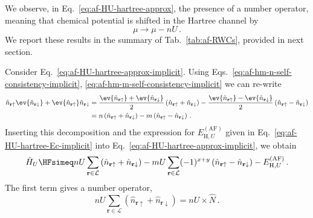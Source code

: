 We observe, in Eq.~\eqref{eq:af-HU-hartree-approx}, the presence of a number operator, meaning that chemical potential is shifted in the Hartree channel by
\begin{equation}\label{eq:af-mu-hU}
	\mu \to \mu - nU \, .
\end{equation}
We report these results in the summary of Tab.~\ref{tab:af-RWCs}, provided in next section.

\begin{tabproof}
	
	Consider Eq.~\eqref{eq:af-HU-hartree-approx-implicit}. Using Eqs.~\eqref{eq:af-hm-n-self-consistency-implicit}, \eqref{eq:af-hm-m-self-consistency-implicit} we can re-write
	\[
	\begin{aligned}
		\hat n_{\mathbf{r}\uparrow} \ev{\hat n_{\mathbf{r}\downarrow}} + \ev{\hat n_{\mathbf{r}\uparrow}} \hat n_{\mathbf{r}\downarrow}
		&= \frac{\ev{\hat n_{\mathbf{r}\uparrow}} + \ev{\hat n_{\mathbf{r}\downarrow}}}{2} \left(
		\hat n_{\mathbf{r}\uparrow} + \hat n_{\mathbf{r}\downarrow}
		\right) - \frac{\ev{\hat n_{\mathbf{r}\uparrow}} - \ev{\hat n_{\mathbf{r}\downarrow}}}{2} \left(
		\hat n_{\mathbf{r}\uparrow} - \hat n_{\mathbf{r}\downarrow}
		\right) \\
		&= n \left(
		\hat n_{\mathbf{r}\uparrow} + \hat n_{\mathbf{r}\downarrow}
		\right) - m \left(
		\hat n_{\mathbf{r}\uparrow} - \hat n_{\mathbf{r}\downarrow}
		\right) \, .
	\end{aligned}
	\]
	Inserting this decomposition and the expression for $E_{\mathrm{H},U}^{(\mathrm{AF})}$ given in Eq.~\eqref{eq:af-HU-hartree-Ec-implicit} into Eq.~\eqref{eq:af-HU-hartree-approx-implicit}, we obtain
	\begin{equation} \label{eq:af-HU-hartree-Ec-implicit-int1}
		\hat H_U \HFsimeq nU \sum_{\mathbf{r}\in\mathcal{L}} \left(
		\hat n_{\mathbf{r}\uparrow} + \hat n_{\mathbf{r}\downarrow}
		\right) - mU \sum_{\mathbf{r}\in\mathcal{L}} (-1)^{x+y} \left(
		\hat n_{\mathbf{r}\uparrow} - \hat n_{\mathbf{r}\downarrow}
		\right) - E_{\mathrm{H},U}^{(\mathrm{AF})} \, .
	\end{equation}
	The first term gives a number operator,
	\[
	nU \sum_{\mathbf{r}\in\mathcal{L}} \left(
	\hat n_{\mathbf{r}\uparrow} + \hat n_{\mathbf{r}\downarrow}
	\right) = nU \times \hat N \, .
	\]
	

\end{tabproof}
